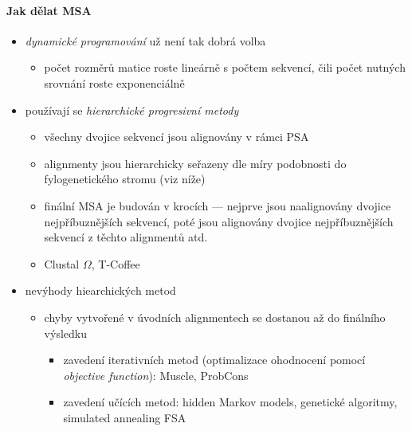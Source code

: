 \documentclass[DIV=8]{scrreprt}
\begin{document}
\paragraph{Jak dělat MSA}
\begin{itemize}[nosep]
    \item \emph{dynamické programování} už není tak dobrá volba
\begin{itemize}[nosep]
    \item počet rozměrů matice roste lineárně s počtem sekvencí, čili počet nutných srovnání roste exponenciálně
\end{itemize}

    \item používají se \emph{hierarchické progresivní metody}
\begin{itemize}[nosep]
    \item všechny dvojice sekvencí jsou alignovány v rámci PSA
    \item alignmenty jsou hierarchicky seřazeny dle míry podobnosti do fylogenetického stromu (viz níže)
    \item finální MSA je budován v krocích --- nejprve jsou naalignovány dvojice nejpříbuznějších sekvencí, poté jsou alignovány dvojice nejpříbuznějších sekvencí z těchto alignmentů atd.
    \item Clustal \(\Omega\), T-Coffee
\end{itemize}

    \item nevýhody hiearchických metod
\begin{itemize}[nosep]
    \item chyby vytvořené v úvodních alignmentech se dostanou až do finálního výsledku
\begin{itemize}[nosep]
    \item zavedení iterativních metod (optimalizace ohodnocení pomocí \emph{objective function}): Muscle, ProbCons
    \item zavedení učících metod: hidden Markov models, genetické algoritmy, simulated annealing FSA
\end{itemize}

\end{itemize}

\end{itemize}
\end{document}
